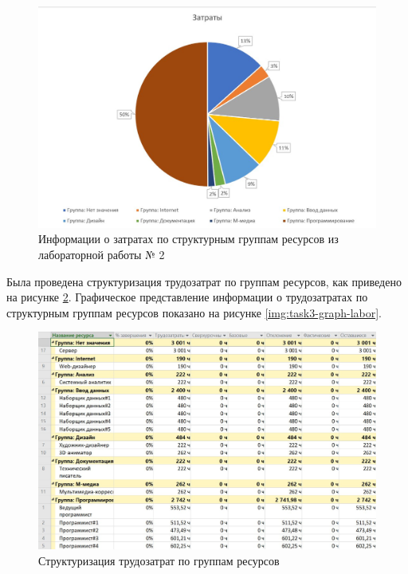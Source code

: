 \begin{figure}[H]
	\begin{center}
		\includegraphics[scale=0.4]{inc/img/task3-costs-graph.jpg}
	\end{center}
	\captionsetup{justification=centering}
	\caption{Информации о затратах по структурным группам ресурсов из лабораторной работы № 2}
	\label{img:task3-costs-graph}
\end{figure}

Была проведена структуризация трудозатрат по группам ресурсов, как приведено на рисунке \ref{img:task3-new-labor-costs}. Графическое представление информации о трудозатратах по структурным группам ресурсов показано на рисунке \ref{img:task3-graph-labor}.

\begin{figure}[H]
	\begin{center}
		\includegraphics[scale=0.3]{inc/img/task3-new-labor-costs.jpg}
	\end{center}
	\captionsetup{justification=centering}
	\caption{Структуризация трудозатрат по группам ресурсов}
	\label{img:task3-new-labor-costs}
\end{figure}


